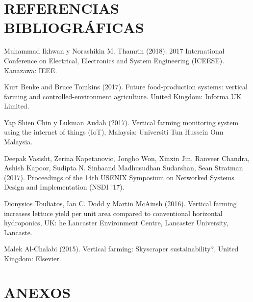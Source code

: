 \documentclass{report}
\begin{document}
\chapter{REFERENCIAS BIBLIOGRÁFICAS}
Muhammad Ikhwan y Norashikin M. Thamrin (2018). 2017 International Conference on
Electrical, Electronics and System Engineering (ICEESE). Kanazawa: IEEE.

Kurt Benke and Bruce Tomkins (2017). Future food-production systems: vertical
farming and controlled-environment agriculture. United Kingdom: Informa UK
Limited.

Yap Shien Chin y Lukman Audah (2017). Vertical farming monitoring system using
the internet of things (IoT), Malaysia: Universiti Tun Hussein Onn Malaysia.

Deepak Vasisht, Zerina Kapetanovic, Jongho Won, Xinxin Jin, Ranveer Chandra,
Ashish Kapoor, Sudipta N. Sinhaand Madhusudhan Sudarshan, Sean Stratman (2017).
Proceedings of the 14th USENIX Symposium on Networked Systems Design and
Implementation (NSDI ’17).

Dionysios Touliatos, Ian C. Dodd y Martin McAinsh (2016). Vertical farming
increases lettuce yield per unit area compared to conventional horizontal
hydroponics, UK: he Lancaster Environment Centre, Lancaster University,
Lancaste.

Malek Al-Chalabi (2015). Vertical farming: Skyscraper sustainability?, United
Kingdom: Elsevier.
\chapter{ANEXOS}
\end{document}
